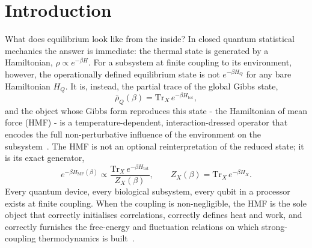 \section{Introduction}
\label{sec:intro}
What does equilibrium look like from the inside? In closed quantum statistical
mechanics the answer is immediate: the thermal state is generated by a
Hamiltonian, $\rho\propto e^{-\beta H}$. For a subsystem at finite coupling to
its environment, however, the operationally defined equilibrium state is not
$e^{-\beta H_Q}$ for any bare Hamiltonian $H_Q$. It is, instead, the partial
trace of the global Gibbs state,
\begin{equation}
    \bar{\rho}_Q(\beta) = \mathrm{Tr}_X\, e^{-\beta H_{\mathrm{tot}}},
    \label{eq:intro_rho_bar}
\end{equation}
and the object whose Gibbs form reproduces this state - the Hamiltonian of
mean force (HMF) - is a temperature-dependent, interaction-dressed operator
that encodes the full non-perturbative influence of the environment on the
subsystem~\cite{campisiFluctuationTheoremArbitrary2009,talknerColloquiumStatisticalMechanics2020,trushechkinOpenQuantumSystem2022,campbellRoadmapQuantumThermodynamics2026,binderThermodynamicsQuantumRegime2018}. The
HMF is not an optional reinterpretation of the reduced state; it is its exact
generator,
\begin{equation}
    e^{-\beta H_{\mathrm{MF}}(\beta)}
    \propto \frac{\mathrm{Tr}_X\, e^{-\beta H_{\mathrm{tot}}}}{Z_X(\beta)},
    \qquad Z_X(\beta)=\mathrm{Tr}_X\, e^{-\beta H_X}.
    \label{eq:intro_hmf_def}
\end{equation}
Every quantum device, every biological subsystem, every qubit in a processor
exists at finite coupling. When the coupling is non-negligible, the HMF is the
sole object that correctly initialises correlations, correctly defines heat and
work, and correctly furnishes the free-energy and fluctuation relations on which
strong-coupling thermodynamics is
built~\cite{seifertFirstSecondLaw2016,jarzynskiNonequilibriumWorkTheorem2004,millerEntropyProduction2017,lacerdaQuantumThermodynamicsFast2023,BinderVinjanampathyModiGoold2015,espositoNatureHeatStrongly2015,rivasStrongCouplingThermodynamics2020,strasbergMeasurabilityNonequilibriumThermodynamics2020,pechukasReducedDynamicsNeed1994b,gelinThermodynamicsSubensembleCanonical2009a}.

